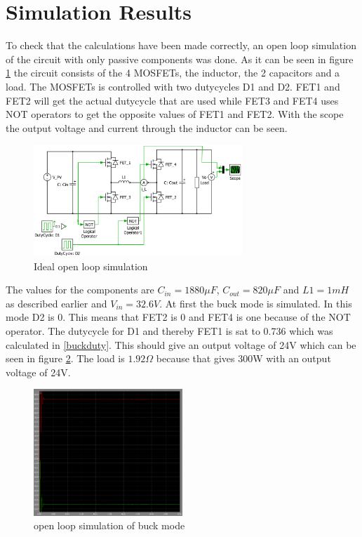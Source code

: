 \section{Simulation Results}

To check that the calculations have been made correctly, an open loop simulation of the circuit with only passive components was done. As it can be seen in figure \ref{openloop} the circuit consists of the 4 MOSFETs, the inductor, the 2 capacitors and a load. The MOSFETs is controlled with two dutycycles D1 and D2. FET1 and FET2 will get the actual dutycycle that are used while FET3 and FET4 uses NOT operators to get the opposite values of FET1 and FET2. With the scope the output voltage and current through the inductor can be seen.

\begin{figure}[H]
	\begin{center}
		\includegraphics[width=0.7\textwidth]{../Pictures/openloop}
		\caption{Ideal open loop simulation}
		\label{openloop}
	\end{center}
\end{figure}
The values for the components are $C_{in}=1880\mu F$, $C_{out}=820\mu F$ and $L1=1mH$ as described earlier and $V_{in}=32.6V$. At first the buck mode is simulated. In this mode D2 is 0. This means that FET2 is 0 and FET4 is one because of the NOT operator. The dutycycle for D1 and thereby FET1 is sat to 0.736 which was calculated in \ref{buckduty}. This should give an output voltage of 24V which can be seen in figure \ref{bucksimulation}. The load is $1.92\Omega$ because that gives 300W with an output voltage of 24V.     
\begin{figure}[H]
 	\begin{center}
 		\includegraphics[width=0.5\textwidth]{../Pictures/bucksimulation24}
 		\caption{open loop simulation of buck mode}
 		\label{bucksimulation}
 	\end{center}
\end{figure} 
